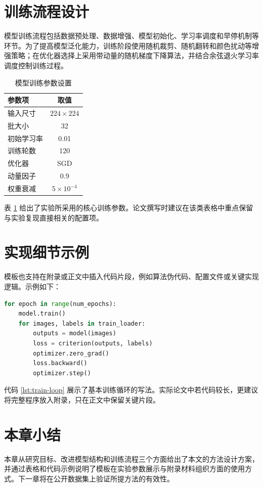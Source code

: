 \section{训练流程设计}

模型训练流程包括数据预处理、数据增强、模型初始化、学习率调度和早停机制等环节。为了提高模型泛化能力，训练阶段使用随机裁剪、随机翻转和颜色扰动等增强策略；在优化器选择上采用带动量的随机梯度下降算法，并结合余弦退火学习率调度控制训练过程。

\begin{table}[htbp]
  \centering
  \caption{模型训练参数设置}
  \label{tab:train-setting}
  \begin{tabular}{lc}
    \toprule
    参数项 & 取值 \\
    \midrule
    输入尺寸 & $224 \times 224$ \\
    批大小 & 32 \\
    初始学习率 & 0.01 \\
    训练轮数 & 120 \\
    优化器 & SGD \\
    动量因子 & 0.9 \\
    权重衰减 & $5\times10^{-4}$ \\
    \bottomrule
  \end{tabular}
\end{table}

表 \ref{tab:train-setting} 给出了实验所采用的核心训练参数。论文撰写时建议在该类表格中重点保留与实验复现直接相关的配置项。

\section{实现细节示例}

模板也支持在附录或正文中插入代码片段，例如算法伪代码、配置文件或关键实现逻辑。示例如下：

\begin{lstlisting}[language=Python,caption={训练循环伪代码示例},label={lst:train-loop}]
for epoch in range(num_epochs):
    model.train()
    for images, labels in train_loader:
        outputs = model(images)
        loss = criterion(outputs, labels)
        optimizer.zero_grad()
        loss.backward()
        optimizer.step()
\end{lstlisting}

代码 \ref{lst:train-loop} 展示了基本训练循环的写法。实际论文中若代码较长，更建议将完整程序放入附录，只在正文中保留关键片段。

\section{本章小结}

本章从研究目标、改进模型结构和训练流程三个方面给出了本文的方法设计方案，并通过表格和代码示例说明了模板在实验参数展示与附录材料组织方面的使用方式。下一章将在公开数据集上验证所提方法的有效性。
